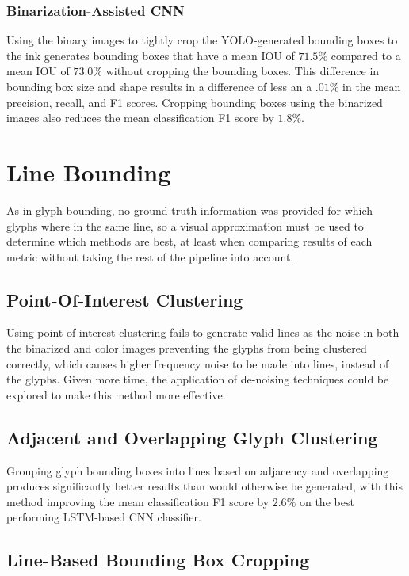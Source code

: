 \subsubsection{Binarization-Assisted CNN}
Using the binary images to tightly crop the YOLO-generated bounding boxes to the ink generates bounding boxes that have a mean IOU of $71.5\%$ compared to a mean IOU of $73.0\%$ without cropping the bounding boxes. This difference in bounding box size and shape results in a difference of less an a $.01\%$ in the mean precision, recall, and F1 scores. Cropping bounding boxes using the binarized images also reduces the mean classification F1 score by $1.8\%$.

\section{Line Bounding}

As in glyph bounding, no ground truth information was provided for which glyphs where in the same line, so a visual approximation must be used to determine which methods are best, at least when comparing results of each metric without taking the rest of the pipeline into account.

\subsection{Point-Of-Interest Clustering}

Using point-of-interest clustering fails to generate valid lines as the noise in both the binarized and color images preventing the glyphs from being clustered correctly, which causes higher frequency noise to be made into lines, instead of the glyphs. Given more time, the application of de-noising techniques could be explored to make this method more effective.

\subsection{Adjacent and Overlapping Glyph Clustering}

Grouping glyph bounding boxes into lines based on adjacency and overlapping produces significantly better results than would otherwise be generated, with this method improving the mean classification F1 score by $2.6\%$ on the best performing LSTM-based CNN classifier.

\subsection{Line-Based Bounding Box Cropping}

